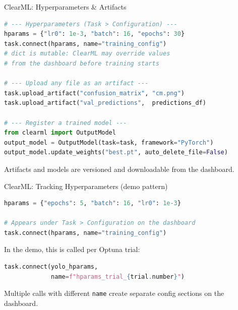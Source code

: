 \documentclass[aspectratio=169]{beamer}
\begin{document}
\begin{frame}[t,fragile]{ClearML: Hyperparameters \& Artifacts}
\vspace*{-0.7cm}
\begin{lstlisting}[language=Python, basicstyle=\footnotesize\ttfamily]
# --- Hyperparameters (Task > Configuration) ---
hparams = {"lr0": 1e-3, "batch": 16, "epochs": 30}
task.connect(hparams, name="training_config")
# dict is mutable: ClearML may override values
# from the dashboard before training starts

# --- Upload any file as an artifact ---
task.upload_artifact("confusion_matrix", "cm.png")
task.upload_artifact("val_predictions",  predictions_df)

# --- Register a trained model ---
from clearml import OutputModel
output_model = OutputModel(task=task, framework="PyTorch")
output_model.update_weights("best.pt", auto_delete_file=False)
\end{lstlisting}
Artifacts and models are versioned and downloadable from the dashboard.
\end{frame}

\begin{frame}[t,fragile]{ClearML: Tracking Hyperparameters (demo pattern)}
\begin{lstlisting}[language=Python, basicstyle=\footnotesize\ttfamily]
hparams = {"epochs": 5, "batch": 16, "lr0": 1e-3}

# Appears under Task > Configuration on the dashboard
task.connect(hparams, name="training_config")
\end{lstlisting}

\vspace{2mm}
In the demo, this is called per Optuna trial:
\begin{lstlisting}[language=Python, basicstyle=\footnotesize\ttfamily]
task.connect(yolo_hparams,
             name=f"hparams_trial_{trial.number}")
\end{lstlisting}
Multiple calls with different \texttt{name} create separate config sections on the dashboard.
\end{frame}
\end{document}
